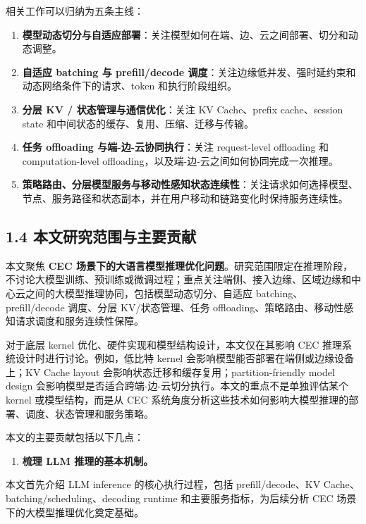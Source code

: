 \documentclass[a4paper,10pt]{ctexart}
\begin{document}
相关工作可以归纳为五条主线：


\begin{enumerate}
\item \textbf{模型动态切分与自适应部署}：关注模型如何在端、边、云之间部署、切分和动态调整。

\item \textbf{自适应 batching 与 prefill/decode 调度}：关注边缘低并发、强时延约束和动态网络条件下的请求、token 和执行阶段组织。

\item \textbf{分层 KV / 状态管理与通信优化}：关注 KV Cache、prefix cache、session state 和中间状态的缓存、复用、压缩、迁移与传输。

\item \textbf{任务 offloading 与端-边-云协同执行}：关注 request-level offloading 和 computation-level offloading，以及端-边-云之间如何协同完成一次推理。

\item \textbf{策略路由、分层模型服务与移动性感知状态连续性}：关注请求如何选择模型、节点、服务路径和状态副本，并在用户移动和链路变化时保持服务连续性。

\end{enumerate}


\subsection*{1.4 本文研究范围与主要贡献}

本文聚焦 \textbf{CEC 场景下的大语言模型推理优化问题}。研究范围限定在推理阶段，不讨论大模型训练、预训练或微调过程；重点关注端侧、接入边缘、区域边缘和中心云之间的大模型推理协同，包括模型动态切分、自适应 batching、prefill/decode 调度、分层 KV/状态管理、任务 offloading、策略路由、移动性感知请求调度和服务连续性保障。


对于底层 kernel 优化、硬件实现和模型结构设计，本文仅在其影响 CEC 推理系统设计时进行讨论。例如，低比特 kernel 会影响模型能否部署在端侧或边缘设备上；KV Cache layout 会影响状态迁移和缓存复用；partition-friendly model design 会影响模型是否适合跨端-边-云切分执行。本文的重点不是单独评估某个 kernel 或模型结构，而是从 CEC 系统角度分析这些技术如何影响大模型推理的部署、调度、状态管理和服务策略。


本文的主要贡献包括以下几点：


\begin{enumerate}
\item \textbf{梳理 LLM 推理的基本机制。}
\end{enumerate}
本文首先介绍 LLM inference 的核心执行过程，包括 prefill/decode、KV Cache、batching/scheduling、decoding runtime 和主要服务指标，为后续分析 CEC 场景下的大模型推理优化奠定基础。
\end{document}
